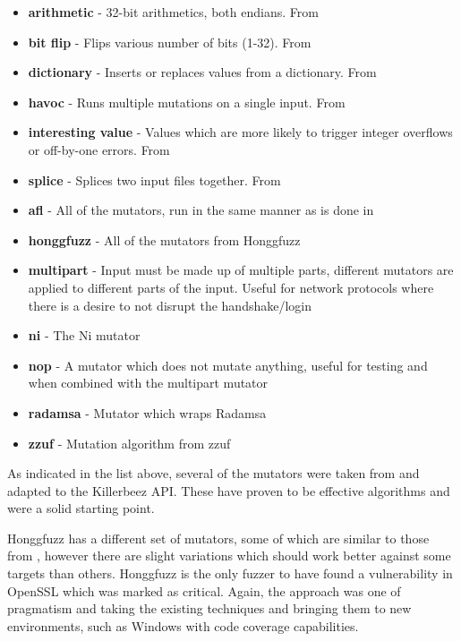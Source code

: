\begin{itemize}[noitemsep]
\item \textbf{arithmetic} - 32-bit arithmetics, both endians. From \AFL{}
\item \textbf{bit flip} - Flips various number of bits (1-32). From \AFL{}
\item \textbf{dictionary} - Inserts or replaces values from a dictionary. From \AFL{}
\item \textbf{havoc} - Runs multiple mutations on a single input. From \AFL{}
\item \textbf{interesting value} - Values which are more likely to trigger
                                   integer overflows or off-by-one errors. From
                                   \AFL{}
\item \textbf{splice} - Splices two input files together. From \AFL{}
\item \textbf{afl} - All of the \AFL{} mutators, run in the same manner as is
                     done in \AFL{}
\item \textbf{honggfuzz} - All of the mutators from Honggfuzz
\item \textbf{multipart} - Input must be made up of multiple parts, different
                           mutators are applied to different parts of the
                           input. Useful for network protocols where there is
                           a desire to not disrupt the handshake/login
\item \textbf{ni} - The Ni mutator
\item \textbf{nop} - A mutator which does not mutate anything, useful for
                     testing and when combined with the multipart mutator
\item \textbf{radamsa} - Mutator which wraps Radamsa\cite{radamsa}
\item \textbf{zzuf} - Mutation algorithm from zzuf\cite{zzuf}
\end{itemize}

As indicated in the list above, several of the mutators were taken from \AFL{}
and adapted to the Killerbeez API. These have proven to be effective algorithms
and were a solid starting point.

Honggfuzz has a different set of mutators, some of which are similar to those
from \AFL{}, however there are slight variations which should work better
against some targets than others.  Honggfuzz is the only fuzzer to have found a
vulnerability in OpenSSL which was marked as critical.  Again, the approach was
one of pragmatism and taking the existing techniques and bringing them to new
environments, such as Windows with code coverage capabilities.

